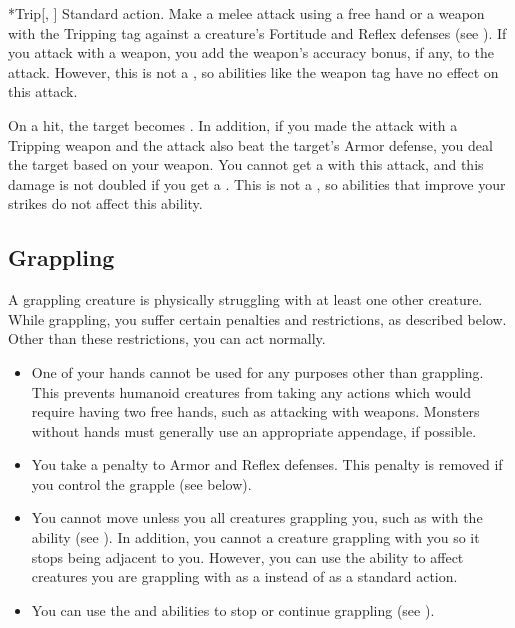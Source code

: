     \begin{activeability}*{Trip}[, ]
      \abilityusagetime Standard action.
      \rankline
      Make a melee attack using a free hand or a weapon with the Tripping tag against a creature's Fortitude and Reflex defenses (see ).
      If you attack with a weapon, you add the weapon's accuracy bonus, if any, to the attack.
      However, this is not a , so abilities like the  weapon tag have no effect on this attack.

      On a hit, the target becomes \prone.
      In addition, if you made the attack with a Tripping weapon and the attack also beat the target's Armor defense, you deal the target  based on your weapon.
      You cannot get a  with this attack, and this damage is not doubled if you get a .
      This is not a , so abilities that improve your strikes do not affect this ability.
    \end{activeability}

  \subsection{Grappling}\label{Grappling}
    A grappling creature is physically struggling with at least one other creature.
    While grappling, you suffer certain penalties and restrictions, as described below.
    Other than these restrictions, you can act normally.
    \begin{itemize}
      \item One of your hands cannot be used for any purposes other than grappling.
        This prevents humanoid creatures from taking any actions which would require having two free hands, such as attacking with  weapons.
        Monsters without hands must generally use an appropriate appendage, if possible.
      \item You take a  penalty to Armor and Reflex defenses.
        This penalty is removed if you control the grapple (see below).
      \item You cannot move unless you  all creatures grappling you, such as with the  ability (see ).
        In addition, you cannot  a creature grappling with you so it stops being adjacent to you.
        However, you can use the  ability to affect creatures you are grappling with as a  instead of as a standard action.
      \item You can use the  and  abilities to stop or continue grappling (see ).
    \end{itemize}

